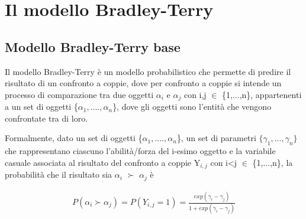 \chapter{Il modello Bradley-Terry}



\section{Modello Bradley-Terry base}
Il modello Bradley-Terry \autocite{bradley1952rank} è un modello probabilistico che permette di predire il risultato di un confronto a coppie, dove per confronto a coppie si intende un processo di comparazione tra due oggetti $\alpha_{i}$ e $\alpha_{j}$ con i,j $\in$ \{1,...,n\}, appartenenti a un set di oggetti \{$\alpha_{1},....,\alpha_{n}$\}, dove gli oggetti sono l'entità che vengono confrontate tra di loro.

Formalmente, dato un set di oggetti \{$\alpha_{1},....,\alpha_{n}$\}, un set di parametri $ \{\gamma_{1}, ..., \gamma_{n}\}$ che rappresentano ciascuno l'abilità/forza del i-esimo oggetto e la variabile casuale associata al risultato del confronto a coppie Y$_{i,j}$ con i<j $\in$ \{1,...,n\}, la probabilità che il risultato sia $\alpha_{i}$ $\succ$ $\alpha_{j}$ è

\begin{align} 
	P(\alpha_{i} \succ \alpha_{j}) = P(Y_{i,j} = 1) = \frac{exp(\gamma_{i} - \gamma_{j})}{1 + exp(\gamma_{i} - \gamma_{j})} \label{for:3.1} 
\end{align}

